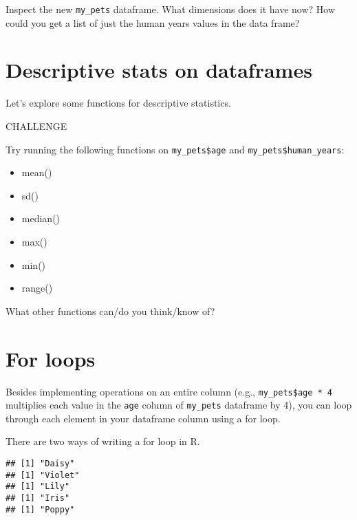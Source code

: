 \documentclass[]{book}
\newenvironment{Shaded}{\begin{snugshade}}{\end{snugshade}}
\newcommand{\ControlFlowTok}[1]{\textcolor[rgb]{0.13,0.29,0.53}{\textbf{#1}}}
\newcommand{\KeywordTok}[1]{\textcolor[rgb]{0.13,0.29,0.53}{\textbf{#1}}}
\newcommand{\NormalTok}[1]{#1}
\newcommand{\OperatorTok}[1]{\textcolor[rgb]{0.81,0.36,0.00}{\textbf{#1}}}
\begin{document}
\leavevmode\hypertarget{question}{}%
Inspect the new \texttt{my\_pets} dataframe. What dimensions does it have now? How could you get a list of just the human years values in the data frame?

\hypertarget{descriptive-stats-on-dataframes}{%
\section{Descriptive stats on dataframes}\label{descriptive-stats-on-dataframes}}

Let's explore some functions for descriptive statistics.

\leavevmode\hypertarget{challenge}{}%
CHALLENGE

Try running the following functions on \texttt{my\_pets\$age} and \texttt{my\_pets\$human\_years}:

\begin{itemize}
\item
  mean()
\item
  sd()
\item
  median()
\item
  max()
\item
  min()
\item
  range()
\end{itemize}

What other functions can/do you think/know of?

\hypertarget{for-loops}{%
\section{For loops}\label{for-loops}}

Besides implementing operations on an entire column (e.g., \texttt{my\_pets\$age\ *\ 4} multiplies each value in the \texttt{age} column of \texttt{my\_pets} dataframe by 4), you can loop through each element in your dataframe column using a for loop.

There are two ways of writing a for loop in R.

\begin{Shaded}
\end{Shaded}

\begin{verbatim}
## [1] "Daisy"
## [1] "Violet"
## [1] "Lily"
## [1] "Iris"
## [1] "Poppy"
\end{verbatim}
\end{document}
